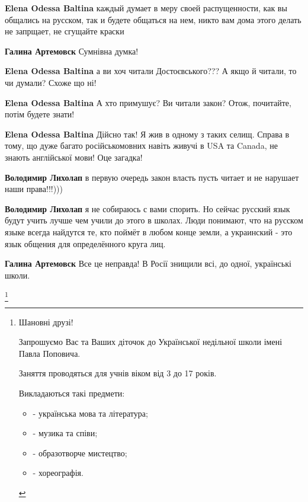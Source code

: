 \begin{itemize}
\begin{itemize}
\textbf{Elena Odessa Baltina} каждый думает в меру своей распущенности, как вы
общались на русском, так и будете общаться на нем, никто вам дома этого делать
не запрщает, не сгущайте краски

\textbf{Галина Артемовск} Сумнівна думка!

\textbf{Elena Odessa Baltina} а ви хоч читали Достоєвського??? А якщо й читали, то чи думали? Схоже що ні!

\textbf{Elena Odessa Baltina} А хто примушує? Ви читали закон? Отож, почитайте, потім будете знати!

\textbf{Elena Odessa Baltina} Дійсно так! Я жив в одному з таких селищ. Справа
в тому, що дуже багато російськомовних навіть живучі в USA та Canada, не знають
англійської мови! Оце загадка!

\textbf{Володимир Лихолап} в первую очередь закон власть пусть читает и не
нарушает наши права!!!)))

\textbf{Володимир Лихолап} я не собираюсь с вами спорить. Но сейчас русский
язык будут учить лучше чем учили до этого в школах. Люди понимают, что на
русском языке всегда найдутся те, кто поймёт в любом конце земли, а украинский
- это язык общения для определённого круга лиц.

\textbf{Галина Артемовск} Все це неправда! В Росії знищили всі, до одної,
українські школи.

\footnote{
Шановні друзі!

Запрошуємо Вас та Ваших діточок до Української недільної школи імені Павла Поповича.

Заняття проводяться для учнів віком від 3 до 17 років.

Викладаються такі предмети:

\begin{itemize}
  \item - українська мова та література;
  \item - музика та співи;
  \item - образотворче мистецтво;
  \item - хореографія.
\end{itemize}

}
\end{itemize}
\end{itemize}
